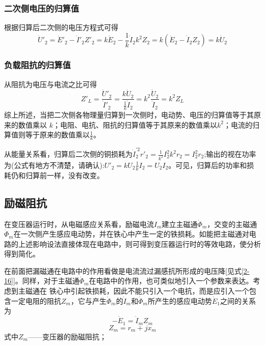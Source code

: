 \documentclass{book}
\begin{document}
\subsubsection{二次侧电压的归算值}
根据归算后二次侧的电压方程式可得
\begin{equation}
{{{\dot{U}}'}_{2}}={{{\dot{E}}'}_{2}}-{{{\dot{I}}'}_{2}}{{{Z}'}_{2}}=k{{\dot{E}}_{2}}-\frac{1}{k}{{\dot{I}}_{2}}{{k}^{2}}{{Z}_{2}}=k\left( {{{\dot{E}}}_{2}}-{{{\dot{I}}}_{2}}{{Z}_{2}} \right)=k{{\dot{U}}_{2}}
\label{2-33}
\end{equation}

\subsubsection{负载阻抗的归算值}
从阻抗为电压与电流之比可得
\begin{equation}
{{{Z}'}_{L}}=\frac{{{{{\dot{U}}'}}_{2}}}{{{{{\dot{I}}'}}_{2}}}=\frac{k{{{\dot{U}}}_{2}}}{\frac{1}{k}{{{\dot{I}}}_{2}}}={{k}^{2}}\frac{{{{\dot{U}}}_{2}}}{{{{\dot{I}}}_{2}}}={{k}^{2}}{{Z}_{L}}
\label{2-34}
\end{equation}
综上所述，当把二次侧各物理量归算到一次侧时，电动势、电压的归算值等于其原来的数值乘以 $k$；电阻、电抗、阻抗的归算值等于其原来的数值乘以${{k}^{2}}$；电流的归算值则等于原来的数值乘以$\frac{1}{k}$。

从能量关系看，归算后二次侧的铜损耗为$\dot I_2^{\prime2}{r'_2} = {\frac{1} {{k^2}}}I_2^2{k^2}{r_2} = I_2^2{r_2}$;输出的视在功率为(公式有地方不清楚，请确认):${{{U}'}_{2}}=k{{U}_{2}}\frac{1}{k}{{I}_{2}}={{U}_{2}}{{I}_{2}}$。可见，归算后的功率和损耗仍和归算前一样，没有改变。

\subsection{励磁阻抗}
在变压器运行时，从电磁感应关系看，励磁电流${{I}_{m}}$建立主磁通${{\dot{\Phi }}_{m}}$，交变的主磁通${{\dot{\Phi }}_{m}}$在一次侧产生感应电动势，并在铁心中产生一定的铁损耗。如能把主磁通对电路的上述影响设法直接体现在电路中，则可得到变压器运行时的等效电路，使分析得到简化。

在前面把漏磁通在电路中的作用看做是电流流过漏感抗所形成的电压降[见式\eqref{2-16}]。同样，对于主磁通${{\dot{\Phi }}_{m}}$在电路中的作用，也可类似地引入一个参数来表达。考虑到主磁通在 铁心中引起铁损耗，因此不能只引入一个电抗，而是应引入一个包含一定电阻的阻抗${{Z}_{m}}$，它与产生${{\dot{\Phi }}_{m}}$的${{\dot{I}}_{m}}$和${{\dot{\Phi }}_{m}}$所产生的感应电动势${{\dot{E}}_{1}}$之间的关系为
\begin{equation}
-{{\dot{E}}_{1}}={{\dot{I}}_{m}}{{Z}_{m}}
\label{2-35}
\end{equation}
$$
{{Z}_{m}}={{r}_{m}}+j{{x}_{m}}
$$
式中${{Z}_{m}}$——变压器的励磁阻抗；
\end{document}
